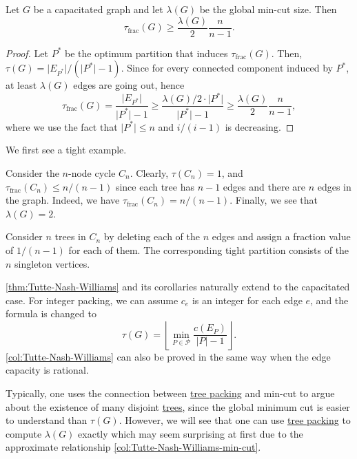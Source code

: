 \begin{corollary}\label{col:Tutte-Nash-Williams-min-cut}
	Let \(G\) be a capacitated graph and let \(\lambda (G)\) be the global min-cut size. Then
	\[
		\tau _{\text{frac} }(G)
		\geq \frac{\lambda (G)}{2} \frac{n}{n - 1}.
	\]
\end{corollary}
\begin{proof}
	Let \(P^{\ast} \) be the optimum partition that induces \(\tau _{\text{frac} }(G)\). Then, \(\tau (G) = \lvert E_{P^{\ast} } \rvert / (\lvert P^{\ast} \rvert - 1)\). Since for every connected component induced by \(P^{\ast} \), at least \(\lambda (G)\) edges are going out, hence
	\[
		\tau _{\text{frac} }(G)
		= \frac{\lvert E_{P^{\ast} } \rvert }{\lvert P^{\ast}  \rvert - 1}
		\geq \frac{\lambda (G) / 2 \cdot \lvert P^{\ast} \rvert }{\lvert P^{\ast} \rvert - 1}
		\geq \frac{\lambda (G)}{2} \frac{n}{n-1},
	\]
	where we use the fact that \(\lvert P^{\ast} \rvert \leq n\) and \(i / (i - 1)\) is decreasing.
\end{proof}

We first see a tight example.

\begin{eg}[Cycle]
	Consider the \(n\)-node cycle \(C_n\). Clearly, \(\tau (C_n) = 1\), and \(\tau _{\text{frac} }(C_n) \leq n / (n-1)\) since each tree has \(n-1\) edges and there are \(n\) edges in the graph. Indeed, we have \(\tau _{\text{frac} } (C_n) = n / (n-1)\). Finally, we see that \(\lambda (G) = 2\).
\end{eg}
\begin{explanation}
	Consider \(n\) trees in \(C_n\) by deleting each of the \(n\) edges and assign a fraction value of \(1 / (n-1)\) for each of them. The corresponding tight partition consists of the \(n\) singleton vertices.
\end{explanation}

\begin{note}
	\autoref{thm:Tutte-Nash-Williams} and its corollaries naturally extend to the capacitated case. For integer packing, we can assume \(c_e\) is an integer for each edge \(e\), and the formula is changed to
	\[
		\tau (G)
		= \left\lfloor \min _{P \in \mathcal{P} } \frac{c(E_P)}{\lvert P \rvert - 1} \right\rfloor .
	\]
	\autoref{col:Tutte-Nash-Williams} can also be proved in the same way when the edge capacity is rational.
\end{note}

Typically, one uses the connection between \hyperref[prb:TP]{tree packing} and min-cut to argue about the existence of many disjoint \hyperref[def:spanning-tree]{trees}, since the global minimum cut is easier to understand than \(\tau (G)\). However, we will see that one can use \hyperref[prb:TP]{tree packing} to compute \(\lambda (G)\) exactly which may seem surprising at first due to the approximate relationship \autoref{col:Tutte-Nash-Williams-min-cut}.

